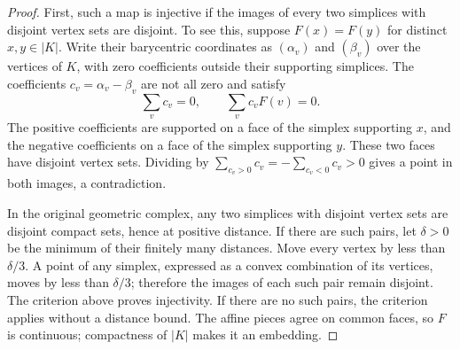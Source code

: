 \documentclass[11pt,reqno]{amsart}
\theoremstyle{plain}
\theoremstyle{definition}
\begin{document}
\begin{proof}
First, such a map is injective if the images of every two simplices with disjoint vertex sets
are disjoint. To see this, suppose $F(x)=F(y)$ for distinct $x,y\in |K|$. Write their barycentric
coordinates as $(\alpha_v)$ and $(\beta_v)$ over the vertices of $K$, with zero coefficients
outside their supporting simplices. The coefficients $c_v=\alpha_v-\beta_v$ are not all zero
and satisfy
\[
  \sum_v c_v=0,\qquad \sum_v c_v F(v)=0.
\]
The positive coefficients are supported on a face of the simplex supporting $x$, and the
negative coefficients on a face of the simplex supporting $y$. These two faces have disjoint
vertex sets. Dividing by $\sum_{c_v>0}c_v=-\sum_{c_v<0}c_v>0$ gives a point in both images,
a contradiction.

In the original geometric complex, any two simplices with disjoint vertex sets are disjoint
compact sets, hence at positive distance. If there are such pairs, let $\delta>0$ be the minimum
of their finitely many distances. Move every vertex by less than $\delta/3$. A point of any
simplex, expressed as a convex combination of its vertices, moves by less than $\delta/3$;
therefore the images of each such pair remain disjoint. The criterion above proves injectivity.
If there are no such pairs, the criterion applies without a distance bound. The affine pieces
agree on common faces, so $F$ is continuous; compactness of $|K|$ makes it an embedding.
\end{proof}
\end{document}
